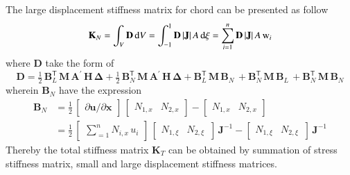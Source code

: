 The large displacement stiffness matrix for chord can be presented as follow
\begin{equation}
\mathbf{K}_{N}  = \int_{V} \mathbf{D} \, \mathrm{d} V \\
 = \int_{-1}^{1} \mathbf{D} \, |\mathbf{J}|  \, A \,  \mathrm{d} \xi 
= \sum_{i=1}^{n} \mathbf{D} \, |\mathbf{J}| \, A \, \mathrm{w}_i
\end{equation}
where $\mathbf{D}$ take the form of
\begin{equation}
\mathbf{D} = \tfrac{1}{2} \, \mathbf{B}_L^{\mathsf{T}} \, \mathbf{M} \, \mathbf{A}^{'} \, \mathbf{H} \, \boldsymbol{\Delta} + \tfrac{1}{2} \, \mathbf{B}_N^{\mathsf{T}} \, \mathbf{M} \, \mathbf{A}^{'} \, \mathbf{H} \, \boldsymbol{\Delta} + \mathbf{B}_L^{\mathsf{T}} \, \mathbf{M} \, \mathbf{B}_N \, + \mathbf{B}_N^{\mathsf{T}} \, \mathbf{M} \, \mathbf{B}_L \, + \mathbf{B}_N^{\mathsf{T}} \, \mathbf{M} \, \mathbf{B}_N 
\end{equation}
wherein $\mathbf{B}_N$ have the expression 
\begin{equation}
\begin{aligned}
\mathbf{B}_{N} & =  \tfrac{1}{2} \, \begin{bmatrix}
\partial \mathbf{u} / \partial \mathbf{x} 
\end{bmatrix} \, \begin{bmatrix}
 N_{1,x} &  N_{2,x}
\end{bmatrix} - \begin{bmatrix}
N_{1,x} &   N_{2,x}
\end{bmatrix}  \\
& = \tfrac{1}{2} \, \begin{bmatrix}
\sum\nolimits_{=1}^n N_{i,x} \, u_i
\end{bmatrix} \, \begin{bmatrix}
 N_{1,\xi} &   N_{2,\xi} \, 
\end{bmatrix} \, \mathbf{J}^{-1} - \begin{bmatrix}
N_{1,\xi} &   N_{2,\xi} \, 
\end{bmatrix} \, \mathbf{J}^{-1}
\end{aligned}
\end{equation}
Thereby the total stiffness matrix $\mathbf{K}_T$ can be obtained by summation of stress stiffness matrix, small and large displacement stiffness matrices.

